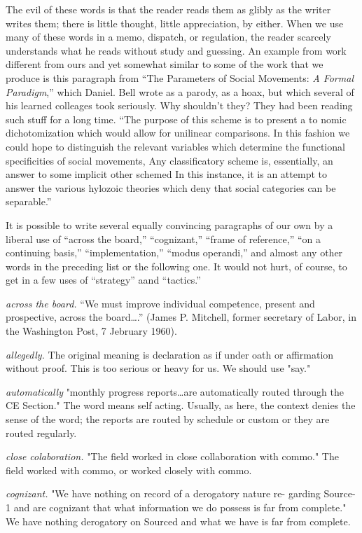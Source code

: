 \documentclass[
    oneside,
    11pt,
    draft
]{memoir}
\begin{document}
The evil of these words is that the reader reads them as glibly as the writer writes them; there is little thought, little appreciation, by either. When we use many of these words in a memo, dispatch, or regulation, the reader scarcely understands what he reads without study and guessing. An example from work different from ours and yet somewhat similar to some of the work that we produce is this paragraph from \enquote{The Parameters of Social Movements: \emph{A Formal Paradigm},} which Daniel. Bell wrote as a parody, as a hoax, but which several of his learned colleages took seriously. Why shouldn't they? They had been reading such stuff for a long time. \enquote{The purpose of this scheme is to present a to nomic dichotomization which would allow for unilinear comparisons. In this fashion we could hope to distinguish the relevant variables which determine the functional specificities of social movements, Any classificatory scheme is, essentially, an answer to some implicit other schemed In this instance, it is an attempt to answer the various hylozoic theories which deny that social categories can be separable.} 

It is possible to write several equally convincing paragraphs of our own by a liberal use of \enquote{across the board,} \enquote{cognizant,} \enquote{frame of reference,} \enquote{on a continuing basis,} \enquote{implementation,} \enquote{modus operandi,} and almost any other words in the preceding list or the following one. It would not hurt, of course, to get in a few uses of \enquote{strategy} aand \enquote{tactics.}

\emph{across the board.} \enquote{We must improve individual competence, present and prospective, across the board\dots.} (James P. Mitchell, former secretary of Labor, in the Washington Post, 7 Jebruary 1960).

\emph{allegedly.} The original meaning is declaration as if under oath or affirmation without proof. This is too serious or heavy for us. We should use "say."

\emph{automatically} "monthly progress reports\dots are automatically routed through the CE Section." The word means self acting. Usually, as here, the context denies the sense of the word; the reports are routed by schedule or custom or they are routed regularly.

\emph{close colaboration.} "The field worked in close collaboration with commo." The field worked with commo, or worked closely with commo. 

\emph{cognizant.} "We have nothing on record of a derogatory nature re- garding Source-1 and are cognizant that what information we do possess is far from complete." We have nothing derogatory on Sourced and what we have is far from complete. 
\end{document}
